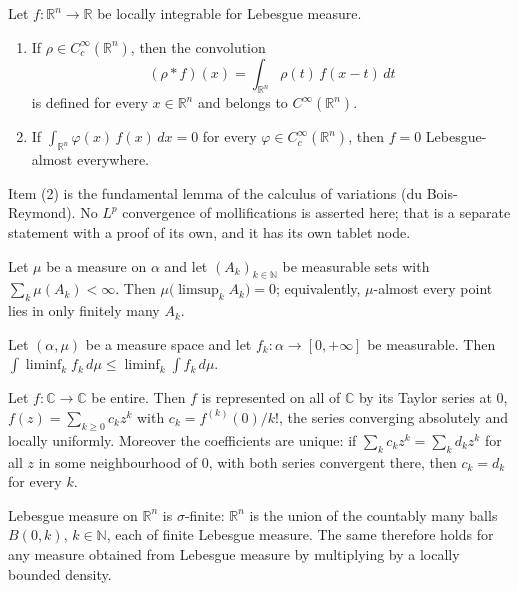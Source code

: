 \begin{proposition}
Let $f : \mathbb{R}^n \to \mathbb{R}$ be locally integrable for Lebesgue
measure.
\begin{enumerate}
\item If $\rho \in C_c^\infty(\mathbb{R}^n)$, then the convolution
\[
  (\rho * f)(x) = \int_{\mathbb{R}^n} \rho(t)\, f(x-t)\, dt
\]
is defined for every $x \in \mathbb{R}^n$ and belongs to
$C^\infty(\mathbb{R}^n)$.
\item If $\int_{\mathbb{R}^n} \varphi(x)\, f(x)\, dx = 0$ for every
$\varphi \in C_c^\infty(\mathbb{R}^n)$, then $f = 0$ Lebesgue-almost
everywhere.
\end{enumerate}
Item (2) is the fundamental lemma of the calculus of variations (du
Bois-Reymond).  No $L^p$ convergence of mollifications is asserted here; that is
a separate statement with a proof of its own, and it has its own tablet node.
\end{proposition}
\begin{proposition}
Let $\mu$ be a measure on $\alpha$ and let $(A_k)_{k\in\mathbb{N}}$ be
measurable sets with $\sum_k \mu(A_k) < \infty$.  Then
$\mu\bigl(\limsup_k A_k\bigr) = 0$; equivalently, $\mu$-almost every point lies
in only finitely many $A_k$.
\end{proposition}
\begin{proposition}
Let $(\alpha,\mu)$ be a measure space and let $f_k : \alpha \to [0,+\infty]$ be
measurable.  Then
$\int \liminf_k f_k \, d\mu \leq \liminf_k \int f_k \, d\mu$.
\end{proposition}
\begin{proposition}
Let $f : \mathbb{C} \to \mathbb{C}$ be entire.  Then $f$ is represented on all
of $\mathbb{C}$ by its Taylor series at $0$,
$f(z) = \sum_{k\geq0} c_k z^k$ with $c_k = f^{(k)}(0)/k!$, the series
converging absolutely and locally uniformly.  Moreover the coefficients are
unique: if $\sum_k c_k z^k = \sum_k d_k z^k$ for all $z$ in some neighbourhood
of $0$, with both series convergent there, then $c_k = d_k$ for every $k$.
\end{proposition}
\begin{proposition}
Lebesgue measure on $\mathbb{R}^n$ is $\sigma$-finite: $\mathbb{R}^n$ is the
union of the countably many balls $B(0,k)$, $k \in \mathbb{N}$, each of finite
Lebesgue measure.  The same therefore holds for any measure obtained from
Lebesgue measure by multiplying by a locally bounded density.
\end{proposition}

